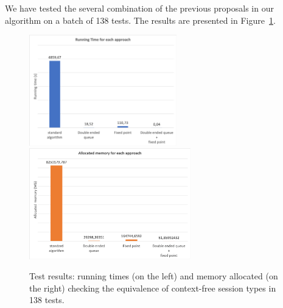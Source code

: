 We have tested the several combination of the previous proposals
in our algorithm on a batch of 138 tests. The results are presented 
in Figure~\ref{fig:results}.

\begin{figure}[h]
	\includegraphics[height=4.8cm]{img/run_time}	\qquad 
	\includegraphics[height=4.8cm]{img/memory_alloc}	
	\caption{Test results: running times (on the left) and
	memory allocated (on the right) checking the equivalence 
	of context-free session types in 138 tests.}
	\label{fig:results}
\end{figure}

